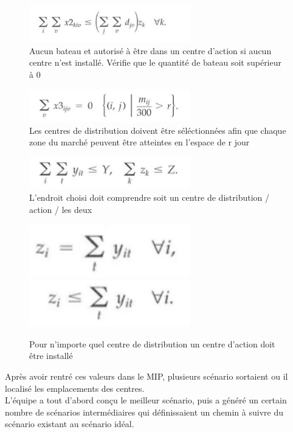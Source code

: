 \documentclass{ceri}
\begin{document}
\begin{figure}
\centering
\includegraphics[width=7cm]{t5.png}
\caption{\label{fig:t5}Aucun bateau et autorisé à être dans un centre d'action si aucun centre n'est installé. Vérifie que le quantité de bateau soit supérieur à 0}
\end{figure}

\begin{figure}
\centering
\includegraphics[width=7cm]{t6.png}
\caption{\label{fig:t6}Les centres de distribution doivent être séléctionnées afin que chaque zone du marché peuvent être atteintes en l'espace de r jour}
\end{figure}

\begin{figure}
\centering
\includegraphics[width=7cm]{t7.png}
\caption{\label{fig:t7}L'endroit choisi doit comprendre soit un centre de distribution / action / les deux}
\end{figure}

\begin{figure}
\centering
\includegraphics[width=7cm]{t8.png}
\includegraphics[width=7cm]{t9.png}
\caption{\label{fig:t8}Pour n'importe quel centre de distribution un centre d'action doit être installé}
\end{figure}

Après avoir rentré ces valeurs dans le MIP, plusieurs scénario sortaient ou il localisé les emplacements des centres.\\
L'équipe a tout d'abord conçu le meilleur scénario, puis a généré un certain nombre de scénarios intermédiaires qui définissaient un chemin à suivre du scénario existant au scénario idéal.\\
\end{document}
